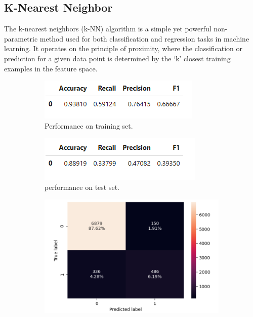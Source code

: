 \documentclass[12pt,a4paper]{article}
\begin{document}
	\subsection{K-Nearest Neighbor}
	The k-nearest neighbors (k-NN) algorithm is a simple yet powerful non-parametric method used for both classification and regression tasks in machine learning. It operates on the principle of proximity, where the classification or prediction for a given data point is determined by the ‘k’ closest training examples in the feature space.
	\begin{figure}[h]
		\centering
		\begin{subfigure}[t]{0.49\textwidth}
			\includegraphics[width=\textwidth]{knn3_train_perf.png}
			\caption{Performance on training set.}
			\label{fig:knn3_train_perf}
		\end{subfigure}
		\hfill
		\begin{subfigure}[t]{0.49\textwidth}
			\includegraphics[width=\textwidth]{knn3_test_perf.png}
			\caption{performance on test set.}
			\label{fig:knn3_test_perf}
		\end{subfigure}
		\begin{subfigure}[t]{0.5\textwidth}
			\includegraphics[width=\textwidth]{Knn3_c_Matrix_train.png}

\end{subfigure}
\end{figure}
\end{document}
